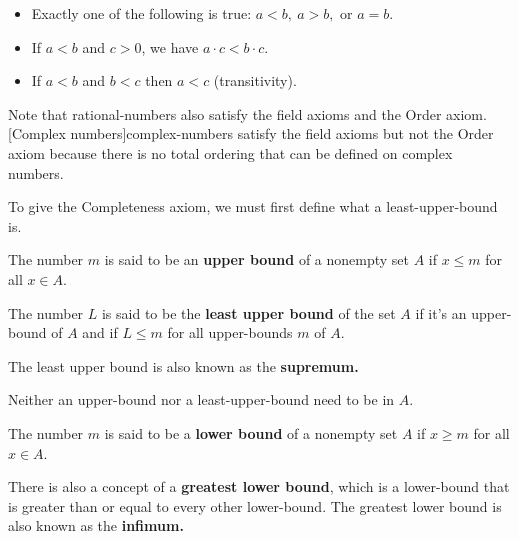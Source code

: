 \documentclass{article}
\begin{document}
\begin{itemize}
\item Exactly one of the following is true: $a < b, ~ a > b,$ or $a = b$.
\end{itemize}

\begin{itemize}
\item If $a < b$ and $c > 0$, we have $a \cdot c < b \cdot c.$
\end{itemize}

\begin{itemize}
\item If $a < b$ and $b < c$ then $a < c$ (transitivity).
\end{itemize}

Note that \@{rational-numbers} also satisfy the field axioms and the Order axiom. \@[Complex numbers]{complex-numbers} satisfy the field axioms but not the Order axiom because there is no total ordering that can be defined on complex numbers.

To give the Completeness axiom, we must first define what a \@{least-upper-bound} is.

\begin{definition}
The number $m$ is said to be an \textbf{upper bound} of a nonempty \@{set} $A$ if $x \leq m$ for all $x \in A$.
\end{definition}

\begin{definition}
The number $L$ is said to be the \textbf{least upper bound} of the set $A$ if it's an \@{upper-bound} of $A$ and if $L \leq m$ for all \@{upper-bounds} $m$ of $A$.
 
The least upper bound is also known as the \textbf{supremum.}
\end{definition}

\begin{note}
Neither an \@{upper-bound} nor a \@{least-upper-bound} need to be in $A$.
\end{note}

\begin{definition}
The number $m$ is said to be a \textbf{lower bound} of a nonempty \@{set} $A$ if $x \geq m$ for all $x \in A.$
\end{definition}

\begin{definition}
There is also a concept of a \textbf{greatest lower bound}, which is a \@{lower-bound} that is greater than or equal to every other \@{lower-bound}. The greatest lower bound is also known as the \textbf{infimum.}
\end{definition}
\end{document}
